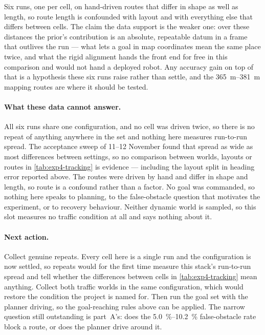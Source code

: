 \documentclass[11pt,a4paper,notitlepage]{report}
\begin{document}
 Six runs, one per
cell, on hand-driven routes that differ in shape as well as length, so route
length is confounded with layout and with everything else that differs between
cells. The claim the data support is the weaker one: over these distances the
prior's contribution is an absolute, repeatable datum in a frame that outlives
the run --- what lets a goal in map coordinates mean the same place twice, and
what the rigid alignment hands the front end for free in this comparison and
would not hand a deployed robot. Any accuracy gain on top of that is a
hypothesis these six runs raise rather than settle, and the
\SIrange{365}{381}{\metre} mapping routes are where it should be tested.

\paragraph{What these data cannot answer.} All six runs share one
configuration, and no cell was driven twice, so there is no repeat of anything
anywhere in the set and nothing here measures run-to-run spread. The acceptance sweep of 11--12
November found that spread as wide as most differences between settings, so no
comparison between worlds, layouts or routes in \cref{tab:exp4-tracking} is
evidence --- including the layout split in heading error reported above. The routes were driven by hand and
differ in shape and length, so route is a confound rather than a factor. No
goal was commanded, so nothing here speaks to planning, to the false-obstacle
question that motivates the experiment, or to recovery behaviour. Neither
dynamic world is sampled, so this slot measures no traffic condition at all and
says nothing about it.

\paragraph{Next action.} Collect genuine repeats. Every cell here is a single
run and the configuration is now settled, so repeats would for the first time
measure this stack's run-to-run spread and tell whether the differences between
cells in \cref{tab:exp4-tracking} mean anything. Collect both traffic worlds in
the same configuration, which would restore the condition the project is named
for. Then run the goal set with the planner driving, so the goal-reaching rules above
can be applied. The narrow question still outstanding is part~A's: does
the \SIrange{5.0}{10.2}{\percent} false-obstacle rate block a route, or does the
planner drive around it.
\end{document}
